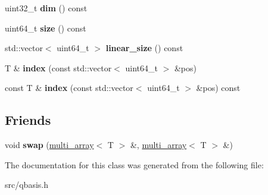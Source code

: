 \begin{DoxyCompactItemize}
\mbox{\label{classqbasis_1_1multi__array_a2c1bfcc8fe3c7940089c461d201b1571}} 
uint32\+\_\+t {\bfseries dim} () const
\item 
\mbox{\label{classqbasis_1_1multi__array_a82aab31fbc7a315e5861796b63f503eb}} 
uint64\+\_\+t {\bfseries size} () const
\item 
\mbox{\label{classqbasis_1_1multi__array_aef35a306447f3e2822a1acfc3d87b1c1}} 
std\+::vector$<$ uint64\+\_\+t $>$ {\bfseries linear\+\_\+size} () const
\item 
\mbox{\label{classqbasis_1_1multi__array_a6bc95cb735a98fa2ed3267f245865a51}} 
T \& {\bfseries index} (const std\+::vector$<$ uint64\+\_\+t $>$ \&pos)
\item 
\mbox{\label{classqbasis_1_1multi__array_a0ab5d8f37c9e7a3810e71020d7d1e244}} 
const T \& {\bfseries index} (const std\+::vector$<$ uint64\+\_\+t $>$ \&pos) const
\end{DoxyCompactItemize}
\subsection*{Friends}
\begin{DoxyCompactItemize}
\item 
\mbox{\label{classqbasis_1_1multi__array_afe6466291618fe32c4be831b8ca25a1c}} 
void {\bfseries swap} (\hyperlink{classqbasis_1_1multi__array}{multi\+\_\+array}$<$ T $>$ \&, \hyperlink{classqbasis_1_1multi__array}{multi\+\_\+array}$<$ T $>$ \&)
\end{DoxyCompactItemize}


The documentation for this class was generated from the following file\+:\begin{DoxyCompactItemize}
\item 
src/qbasis.\+h\end{DoxyCompactItemize}
